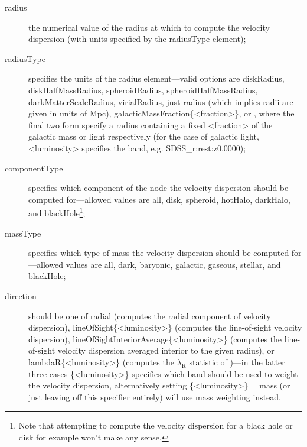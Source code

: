 \begin{description}
 \item [{\normalfont \ttfamily radius}] the numerical value of the radius at which to compute the velocity dispersion (with units specified by the {\normalfont \ttfamily radiusType} element);
 \item [{\normalfont \ttfamily radiusType}] specifies the units of the {\normalfont \ttfamily radius} element---valid options are {\normalfont \ttfamily diskRadius}, {\normalfont \ttfamily diskHalfMassRadius}, {\normalfont \ttfamily spheroidRadius}, {\normalfont \ttfamily spheroidHalfMassRadius}, {\normalfont \ttfamily darkMatterScaleRadius}, {\normalfont \ttfamily virialRadius}, just {\normalfont \ttfamily radius} (which implies radii are given in units of Mpc), {\normalfont \ttfamily galacticMassFraction\{\textless fraction\textgreater\}}, or , where the final two form specify a radius containing a fixed {\normalfont \ttfamily \textless fraction\textgreater} of the galactic mass or light respectively (for the case of galactic light, {\normalfont \ttfamily \textless luminosity\textgreater} specifies the band, e.g. {\normalfont \ttfamily SDSS\_r:rest:z0.0000});
 \item [{\normalfont \ttfamily componentType}] specifies which component of the node the velocity dispersion should be computed for---allowed values are {\normalfont \ttfamily all}, {\normalfont \ttfamily disk}, {\normalfont \ttfamily spheroid}, {\normalfont \ttfamily hotHalo}, {\normalfont \ttfamily darkHalo}, and {\normalfont \ttfamily blackHole}\footnote{Note that attempting to compute the velocity dispersion for a black hole or disk for example won't make any sense.};
 \item [{\normalfont \ttfamily massType}] specifies which type of mass the velocity dispersion should be computed for---allowed values are {\normalfont \ttfamily all}, {\normalfont \ttfamily dark}, {\normalfont \ttfamily baryonic}, {\normalfont \ttfamily galactic}, {\normalfont \ttfamily gaseous}, {\normalfont \ttfamily stellar}, and {\normalfont \ttfamily blackHole};
 \item [{\normalfont \ttfamily direction}] should be one of {\normalfont \ttfamily radial} (computes the radial component of velocity dispersion), {\normalfont \ttfamily lineOfSight\{\textless luminosity\textgreater\}} (computes the line-of-sight velocity dispersion), {\normalfont \ttfamily lineOfSightInteriorAverage\{\textless luminosity\textgreater\}} (computes the line-of-sight velocity dispersion averaged interior to the given radius), or {\normalfont \ttfamily lambdaR\{\textless luminosity\textgreater\}} (computes the $\lambda_\mathrm{R}$ statistic of \citealt{cappellari_sauron_2007})---in the latter three cases {\normalfont \ttfamily \{\textless luminosity\textgreater\}} specifies which band should be used to weight the velocity dispersion, alternatively setting {\normalfont \ttfamily \{\textless luminosity\textgreater\}}$=${\normalfont \ttfamily mass} (or just leaving off this specifier entirely) will use mass weighting instead.
\end{description}

